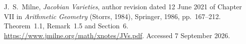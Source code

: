 J.~S.~Milne, \emph{Jacobian Varieties}, author revision dated
12 June 2021 of Chapter VII in \emph{Arithmetic Geometry}
(Storrs, 1984), Springer, 1986, pp.~167--212.
Theorem~1.1, Remark~1.5 and Section~6.
\url{https://www.jmilne.org/math/xnotes/JVs.pdf}.
Accessed 7 September 2026.

